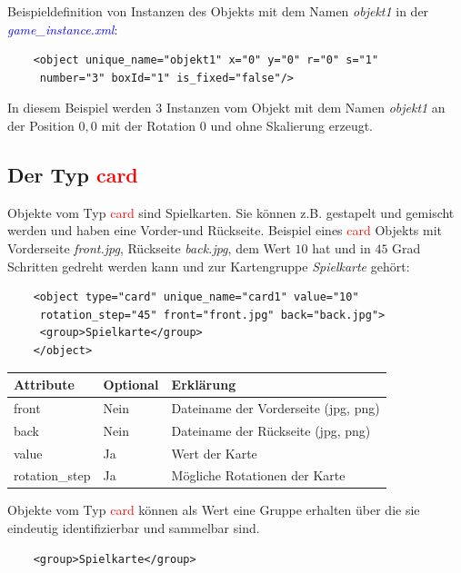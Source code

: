 \documentclass[ngerman]{scrbook}
\newcommand{\gamefile}[1]{\textit{\textcolor{blue}{#1}}\xspace}
\newcommand{\gameinstance}{\gamefile{game\_instance.xml}}
\newcommand{\card}{\textcolor{red}{card}\xspace}
\begin{document}
	Beispieldefinition von Instanzen des Objekts mit dem Namen \textit{objekt1} in der \gameinstance:
	
	\lstset{language=XML}
	\begin{lstlisting}
	<object unique_name="objekt1" x="0" y="0" r="0" s="1" 
	 number="3" boxId="1" is_fixed="false"/>
	\end{lstlisting}
	
	In diesem Beispiel werden $3$ Instanzen vom Objekt mit dem Namen \textit{objekt1} an der Position $0,0$ mit der Rotation $0$ und ohne Skalierung erzeugt.

	
	\subsection{Der Typ \card}
	Objekte vom Typ \card sind Spielkarten. Sie können z.B. gestapelt und gemischt werden und haben eine Vorder-und Rückseite.
	Beispiel eines \card Objekts mit Vorderseite \textit{front.jpg}, Rückseite \textit{back.jpg}, dem Wert $10$ hat und in $45$ Grad Schritten gedreht werden kann und zur Kartengruppe \textit{Spielkarte} gehört:
	
	\lstset{language=XML}
	\begin{lstlisting}
	<object type="card" unique_name="card1" value="10"
	 rotation_step="45" front="front.jpg" back="back.jpg">
	 <group>Spielkarte</group>
	</object>
	\end{lstlisting}
	
	\begin{table}[!h]
		\renewcommand{\arraystretch}{1.5}		\begin{tabularx}{\textwidth}{XXX}
			Attribute & Optional & Erklärung\\\hline
			front & Nein & Dateiname der Vorderseite (jpg, png)\\
			back & Nein & Dateiname der Rückseite (jpg, png)\\
			value & Ja & Wert der Karte\\
			rotation\_step & Ja & Mögliche Rotationen der Karte\\
		\end{tabularx}
	\end{table}

	Objekte vom Typ \card können als Wert eine Gruppe erhalten über die sie eindeutig identifizierbar und sammelbar sind.

	\lstset{language=XML}
	\begin{lstlisting}	
	<group>Spielkarte</group>
	\end{lstlisting}
\end{document}
